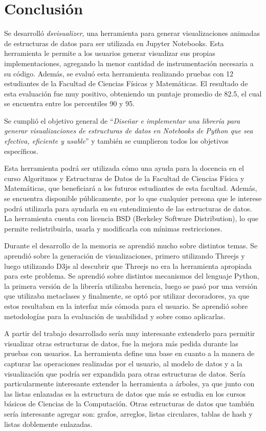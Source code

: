 \chapter{Conclusión}


Se desarrolló \textit{dsvisualizer}, una herramienta para generar visualizaciones animadas de estructuras de datos para ser utilizada en Jupyter Notebooks. Esta herramienta le permite a los usuarios generar visualizar sus propias implementaciones, agregando la menor cantidad de instrumentación necesaria a su código. Además, se evaluó esta herramienta realizando pruebas con 12 estudiantes de la Facultad de Ciencias Físicas y Matemáticas. El resultado de esta evaluación fue muy positivo, obteniendo un puntaje promedio de 82.5, el cual se encuentra entre los percentiles 90 y 95.

Se cumplió el objetivo general de ``\textit{Diseñar e implementar una librería para generar visualizaciones de estructuras de datos en Notebooks de Python que sea efectiva, eficiente y usable}'' y también se cumplieron todos los objetivos específicos.

Esta herramienta podrá ser utilizada cómo una ayuda para la docencia en el curso Algoritmos y Estructuras de Datos de la Facultad de Ciencias Física y Matemáticas, que beneficiará a los futuros estudiantes de esta facultad. Además, se encuentra disponible públicamente, por lo que cualquier persona que le interese podrá utilizarla para ayudarla en su entendimiento de las estructuras de datos. La herramienta cuenta con licencia BSD (Berkeley Software Distribution), lo que permite redistribuirla, usarla y modificarla con mínimas restricciones.

Durante el desarrollo de la memoria se aprendió mucho sobre distintos temas. Se aprendió sobre la generación de visualizaciones, primero utilizando Threejs y luego utilizando D3js al descubrir que Threejs no era la herramienta apropiada para este problema. Se aprendió sobre distintos mecanismos del lenguaje Python, la primera versión de la librería utilizaba herencia, luego se pasó por una versión que utilizaba metaclases y finalmente, se optó por utilizar decoradores, ya que estos resultaban en la interfaz más cómoda para el usuario. Se aprendió sobre metodologías para la evaluación de usabilidad y sobre como aplicarlas.

A partir del trabajo desarrollado sería muy interesante extenderlo para permitir visualizar otras estructuras de datos, fue la mejora más pedida durante las pruebas con usuarios. La herramienta define una base en cuanto a la manera de capturar las operaciones realizadas por el usuario, al modelo de datos y a la visualización que podría ser expandida para otras estructuras de datos. Sería particularmente interesante extender la herramienta a árboles, ya que junto con las listas enlazadas es la estructura de datos que más se estudia en los cursos básicos de Ciencias de la Computación. Otras estructuras de datos que también sería interesante agregar son: grafos, arreglos, listas circulares, tablas de hash y listas doblemente enlazadas.

